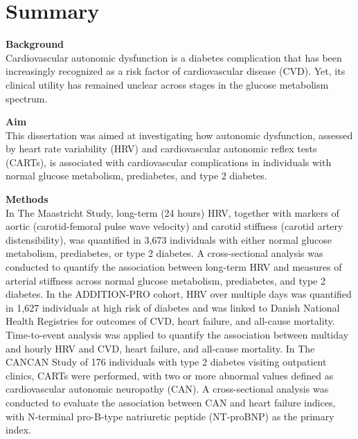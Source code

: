 \documentclass[
  a4paper,
  headsepline=true,
  open=left]{scrbook}
\begin{document}

\hypertarget{summary}{%
\chapter*{Summary}\label{summary}}


\clearpage
\null
\thispagestyle{empty}
\clearpage

\textbf{Background}\\
Cardiovascular autonomic dysfunction is a diabetes complication that has
been increasingly recognized as a risk factor of cardiovascular disease
(CVD). Yet, its clinical utility has remained unclear across stages in
the glucose metabolism spectrum.

\textbf{Aim}\\
This dissertation was aimed at investigating how autonomic dysfunction,
assessed by heart rate variability (HRV) and cardiovascular autonomic
reflex tests (CARTs), is associated with cardiovascular complications in
individuals with normal glucose metabolism, prediabetes, and type 2
diabetes.

\textbf{Methods}\\
In The Maastricht Study, long-term (24 hours) HRV, together with markers
of aortic (carotid-femoral pulse wave velocity) and carotid stiffness
(carotid artery distensibility), was quantified in 3,673 individuals
with either normal glucose metabolism, prediabetes, or type 2 diabetes.
A cross-sectional analysis was conducted to quantify the association
between long-term HRV and measures of arterial stiffness across normal
glucose metabolism, prediabetes, and type 2 diabetes. In the
ADDITION-PRO cohort, HRV over multiple days was quantified in 1,627
individuals at high risk of diabetes and was linked to Danish National
Health Registries for outcomes of CVD, heart failure, and all-cause
mortality. Time-to-event analysis was applied to quantify the
association between multiday and hourly HRV and CVD, heart failure, and
all-cause mortality. In The CANCAN Study of 176 individuals with type 2
diabetes visiting outpatient clinics, CARTs were performed, with two or
more abnormal values defined as cardiovascular autonomic neuropathy
(CAN). A cross-sectional analysis was conducted to evaluate the
association between CAN and heart failure indices, with N-terminal
pro-B-type natriuretic peptide (NT-proBNP) as the primary index.
\end{document}
